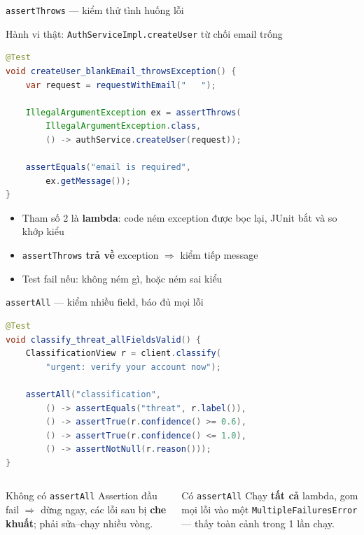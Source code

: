 \documentclass[aspectratio=169,12pt]{beamer}
\begin{document}
\begin{frame}[fragile,shrink=8]{\texttt{assertThrows} --- kiểm thử tình huống lỗi}
  \begin{block}{\small Hành vi thật: \texttt{AuthServiceImpl.createUser} từ chối email trống}
\begin{lstlisting}[language=java]
@Test
void createUser_blankEmail_throwsException() {
    var request = requestWithEmail("   ");

    IllegalArgumentException ex = assertThrows(
        IllegalArgumentException.class,
        () -> authService.createUser(request));

    assertEquals("email is required",
        ex.getMessage());
}
\end{lstlisting}
  \end{block}
  \vspace{-0.2em}
  \begin{itemize}
    \item Tham số 2 là \textbf{lambda}: code ném exception được bọc lại,
          JUnit bắt và so khớp kiểu
    \item \texttt{assertThrows} \textbf{trả về} exception \(\Rightarrow\)
          kiểm tiếp message
    \item Test fail nếu: không ném gì, hoặc ném sai kiểu
  \end{itemize}
\end{frame}

\begin{frame}[fragile,shrink=8]{\texttt{assertAll} --- kiểm nhiều field, báo đủ mọi lỗi}
\begin{lstlisting}[language=java]
@Test
void classify_threat_allFieldsValid() {
    ClassificationView r = client.classify(
        "urgent: verify your account now");

    assertAll("classification",
        () -> assertEquals("threat", r.label()),
        () -> assertTrue(r.confidence() >= 0.6),
        () -> assertTrue(r.confidence() <= 1.0),
        () -> assertNotNull(r.reason()));
}
\end{lstlisting}
  \vspace{0.2em}
  \begin{columns}
    \begin{block}{Không có \texttt{assertAll}}
      Assertion đầu fail \(\Rightarrow\) dừng ngay,
      các lỗi sau bị \textbf{che khuất}; phải sửa--chạy nhiều vòng.
    \end{block}
    \begin{block}{Có \texttt{assertAll}}
      Chạy \textbf{tất cả} lambda, gom mọi lỗi vào một
      \texttt{MultipleFailuresError} --- thấy toàn cảnh trong 1 lần chạy.
    \end{block}
  \end{columns}
\end{frame}
\end{document}

